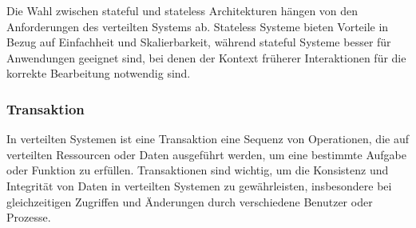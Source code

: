 \documentclass[../vs-script-first-v01.tex]{subfiles}
\begin{document}
Die Wahl zwischen stateful und stateless Architekturen hängen von den Anforderungen des verteilten Systems ab. Stateless Systeme bieten Vorteile in Bezug auf Einfachheit und Skalierbarkeit, während stateful Systeme besser für Anwendungen geeignet sind, bei denen der Kontext früherer Interaktionen für die korrekte Bearbeitung notwendig sind. 

\subsubsection{Transaktion}
In verteilten Systemen ist eine Transaktion eine Sequenz von Operationen, die auf verteilten Ressourcen oder Daten ausgeführt werden, um eine bestimmte Aufgabe oder Funktion zu erfüllen. Transaktionen sind wichtig, um die Konsistenz und Integrität von Daten in verteilten Systemen zu gewährleisten, insbesondere bei gleichzeitigen Zugriffen und Änderungen durch verschiedene Benutzer oder Prozesse.
\end{document}
